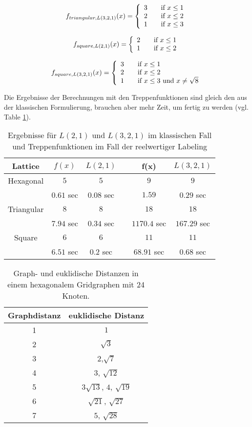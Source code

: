 \documentclass[
	fontsize=12pt,
	paper=a4,
	twoside=false,
	numbers=noenddot,
	plainheadsepline,
	toc=listof,
	toc=bibliography
]{scrartcl}
\begin{document}
\[ f_{triangular,L(3,2,1)}(x) = \left\{
  \begin{array}{l l}
    3 & \quad \text{if $x\le 1$}\\
    2 & \quad \text{if $x\le 2$}\\
    1 & \quad \text{if $x\le 3$}
  \end{array} \right.\]

\[ f_{square,L(2,1)}(x) = \left\{
  \begin{array}{l l}
    2 & \quad \text{if $x\le 1$}\\
    1 & \quad \text{if $x\le 2$}
  \end{array} \right.\]

\[ f_{square,L(3,2,1)}(x) = \left\{
  \begin{array}{l l}
    3 & \quad \text{if $x\le 1$}\\
    2 & \quad \text{if $x\le 2$}\\
    1 & \quad \text{if $x\le 3$ und $x\neq\sqrt{8}$}
  \end{array} \right.\]

Die Ergebnisse der Berechnungen mit den Treppenfunktionen sind gleich den aus der klassischen Formulierung, brauchen aber mehr Zeit, um fertig zu werden (vgl. Table \ref{Table3}).

\begin{table}[htbp]
\centering
  \begin{tabular}{|c|c|c|c|c|c|}
    \hline
    Lattice& $f(x)$  & $L(2,1)$ & & f(x) & $L(3,2,1)$ \\ \hline
    Hexagonal	& $5$ & $5$ & & $9$ & $9$ \\
			& $0.61$ sec	& $0.08$ sec & & $1.59$ & $0.29$ sec\\ \hline
    Triangular	& $8$ & $8$ & & $18$ &  $18$\\
			& $7.94$ sec & $0.34$ sec & & $1170.4$ sec & $167.29$ sec \\ \hline
    Square	& $6$ & $6$ & & $11$ & $11$\\
			& $6.51$ sec & $0.2$ sec & & $68.91$ sec & $0.68$ sec\\   \hline
  \end{tabular}
\caption{Ergebnisse für $L(2,1)$ und $L(3,2,1)$ im klassischen Fall und Treppenfunktionen im Fall der reelwertiger Labeling}
\label{Table3}
\end{table}

\begin{table}[tb]
\centering
  \begin{tabular}{|c|c|}
  \hline
   Graphdistanz	& euklidische Distanz \\ \hline
		1	& $1$\\
		2	& $\sqrt{3}$\\
		3	& $2$,$\sqrt{7}$\\
		4	& $3$, $\sqrt{12}$\\
		5	& $3\sqrt{13}$, $4$, $\sqrt{19}$\\
		6	& $\sqrt{21}$, $\sqrt{27}$\\
		7	& $5$, $\sqrt{28}$\\
  \hline
  \end{tabular}
\caption{Graph- und euklidische Distanzen in einem hexagonalem Gridgraphen mit 24 Knoten.}
\label{TreppFunk1}
\end{table}
\end{document}
